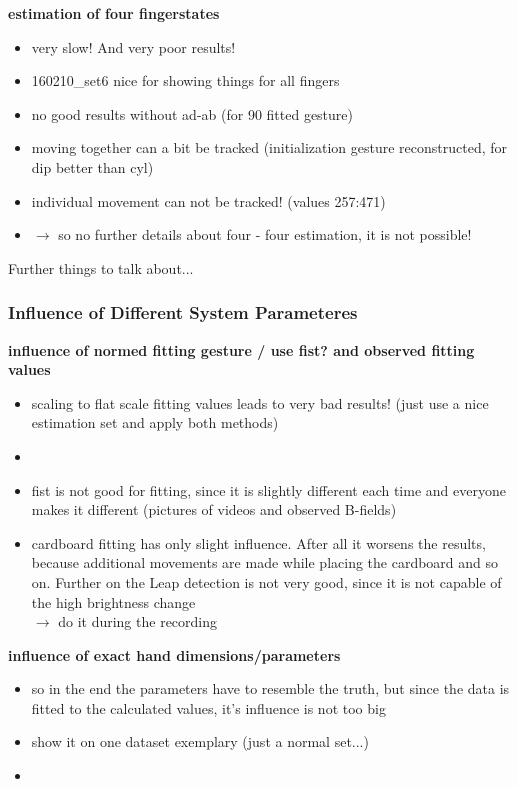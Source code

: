 \textbf{estimation of four fingerstates}
	\begin{itemize}
	\item very slow! And very poor results!
	\item 160210\_set6 nice for showing things for all fingers
	\item no good results without ad-ab (for 90 fitted gesture)
	\item moving together can a bit be tracked (initialization gesture reconstructed, for dip better than cyl)
	\item individual movement can not be tracked! (values 257:471)
	\item $ \rightarrow $ so no further details about four - four estimation, it is not possible!
	\end{itemize}
	
	
Further things to talk about... \\
\subsubsection{Influence of Different System Parameteres}

\textbf{influence of normed fitting gesture / use fist? and observed fitting values}
	\begin{itemize}
	\item scaling to flat scale fitting values leads to very bad results! (just use a nice estimation set and apply both methods)
	\item {}
	\item fist is not good for fitting, since it is slightly different each time and everyone makes it different (pictures of videos and observed B-fields)
	\item cardboard fitting has only slight influence. After all it worsens the results, because additional movements are made while placing the cardboard and so on. Further on the Leap detection is not very good, since it is not capable of the high brightness change\\
	$ \rightarrow $ do it during the recording
	 
	\end{itemize}


\textbf{influence of exact hand dimensions/parameters}
	\begin{itemize}
	\item so in the end the parameters have to resemble the truth, but since the data is fitted to the calculated values, it's influence is not too big
	\item show it on one dataset exemplary (just a normal set...)
	\item {}
	\end{itemize}

